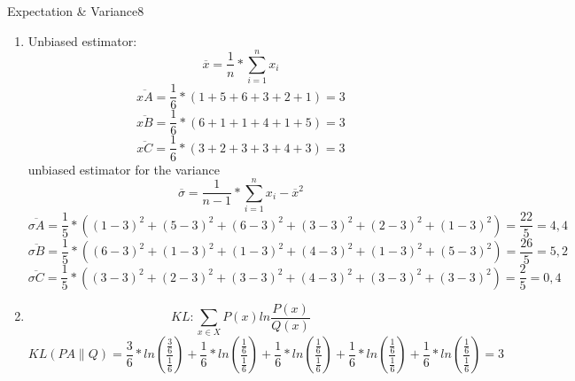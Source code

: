 \begin{questions}
\begin{question}{Expectation \& Variance}{8}
\begin{answer}
\begin{enumerate}
		\item Unbiased estimator: 
		\begin{equation}
		\overline{x} = \frac{1}{n} * \sum\limits_{i=1}^{n} {  x_{ i } }
		\end{equation}
				\begin{equation}
						\overline{xA} = \frac{ 1 }{  6} *(1 + 5 + 6 +3 +2 + 1) = 3
		\end{equation}
				\begin{equation}
						\overline{xB} =\frac{ 1 }{  6} *(6 + 1+ 1 + 4 + 1 + 5) = 3
		\end{equation}
				\begin{equation}
						\overline{xC} =  \frac{ 1 }{  6} *(3 + 2 + 3 + 3 +4 +3) = 3
		\end{equation}
		unbiased estimator for the variance
				\begin{equation}
				\overline{\sigma} = \frac{1}{n -1} * \sum\limits_{i=1}^{n} {  x_{ i }  - \overline{x}}^2
		\end{equation}
		\begin{equation}
		\overline{\sigma A}  = \frac{ 1 }{ 5 } * ((1 - 3)^2 + (5 - 3)^2 + (6 - 3)^2 + (3 - 3)^2 + (2 - 3)^2 + (1 - 3)^2) = \frac{ 22 }{  5} = 4,4
		\end{equation}
				\begin{equation}
		\overline{\sigma B} =\frac{ 1 }{  5} * ((6 - 3)^2 + (1 - 3)^2 + (1 - 3)^2 + (4 - 3)^2 + (1 - 3)^2 + (5 - 3)^2) = \frac{ 26 }{5  } = 5,2
		\end{equation}
				\begin{equation}
		\overline{\sigma C}  = \frac{ 1 }{ 5 }  * ((3 - 3)^2 + (2 - 3)^2 + (3 - 3)^2 + (4 - 3)^2 + (3 - 3)^2 + (3 - 3)^2) = \frac{ 2 }{ 5 } = 0,4
		\end{equation}
		
		
		\item
		\begin{equation}
		KL: \sum\limits_{x\in X}^{} {  P(x) ln \frac{ P(x) }{ Q(x) } }
		\end{equation}
		\begin{equation}
		KL(PA \parallel Q) = \frac{ 3 }{ 6 } * ln (\frac{ \frac{ 3 }{6  } }{ \frac{ 1 }{ 6 } }) + \frac{ 1 }{ 6 } * ln (\frac{ \frac{ 1}{6  } }{ \frac{ 1 }{ 6 } }) +  \frac{ 1 }{ 6 } * ln (\frac{ \frac{ 1}{6  } }{ \frac{ 1 }{ 6 } }) +  \frac{ 1 }{ 6 } * ln (\frac{ \frac{ 1}{6  } }{ \frac{ 1 }{ 6 } }) +  \frac{ 1 }{ 6 } * ln (\frac{ \frac{ 1}{6  } }{ \frac{ 1 }{ 6 } })  = 3
		\end{equation}
		

\end{enumerate}
\end{answer}
\end{question}
\end{questions}
